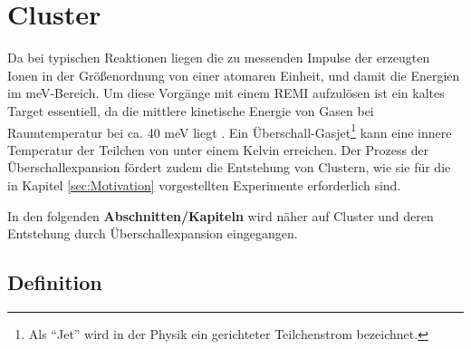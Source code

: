 \newpage
\section{Cluster} \label{sec:Cluster}

Da bei typischen Reaktionen liegen die zu messenden Impulse der erzeugten Ionen in der Größenordnung von einer atomaren Einheit, und damit die Energien im meV-Bereich. Um diese Vorgänge mit einem REMI aufzulösen ist ein kaltes Target essentiell, da die mittlere kinetische Energie von Gasen bei Raumtemperatur bei ca. 40 meV liegt \cite{kurka07}. Ein Überschall-Gasjet\footnote{Als \enquote{Jet} wird in der Physik ein gerichteter Teilchenstrom bezeichnet.} kann eine innere Temperatur der Teilchen von unter einem Kelvin erreichen. Der Prozess der Überschallexpansion fördert zudem die Entstehung von Clustern, wie sie für die in Kapitel \ref{sec:Motivation} vorgestellten Experimente erforderlich sind.

In den folgenden \textbf{Abschnitten/Kapiteln} wird näher auf Cluster und deren Entstehung durch Überschallexpansion eingegangen.


\subsection{Definition}

